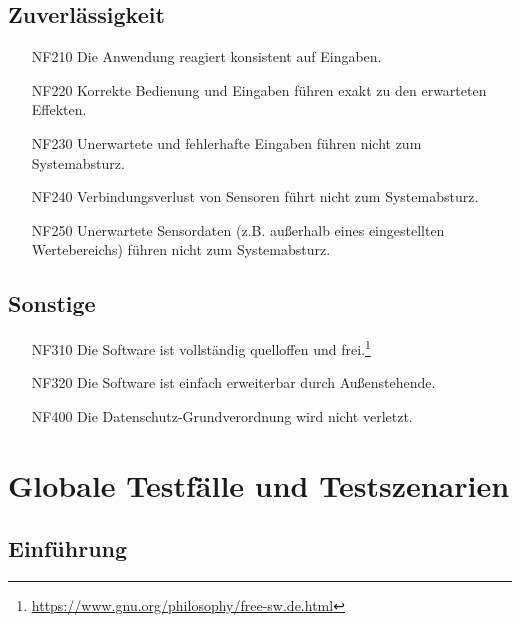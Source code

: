 \documentclass[parskip=full]{scrartcl}
\begin{document}
\subsection{Zuverlässigkeit}

\begin{itemize}

\item[NF210] Die Anwendung reagiert konsistent auf Eingaben.
\item[NF220] Korrekte Bedienung und Eingaben führen exakt zu den erwarteten Effekten.
\item[NF230] Unerwartete und fehlerhafte Eingaben führen nicht zum Systemabsturz.
\item[NF240] Verbindungsverlust von Sensoren führt nicht zum Systemabsturz.
\item[NF250] Unerwartete Sensordaten (z.B. außerhalb eines eingestellten Wertebereichs) führen nicht zum Systemabsturz.

\end{itemize}

\subsection{Sonstige}

\begin{itemize}

\item[NF310] Die Software ist vollständig quelloffen und frei.\footnote{\url{https://www.gnu.org/philosophy/free-sw.de.html}}
\item[NF320] Die Software ist einfach erweiterbar durch Außenstehende.
\item[NF400] Die Datenschutz-Grundverordnung wird nicht verletzt.

\end{itemize}

\section{Globale Testfälle und Testszenarien}\label{testfall}
\subsection{Einführung}
\end{document}

